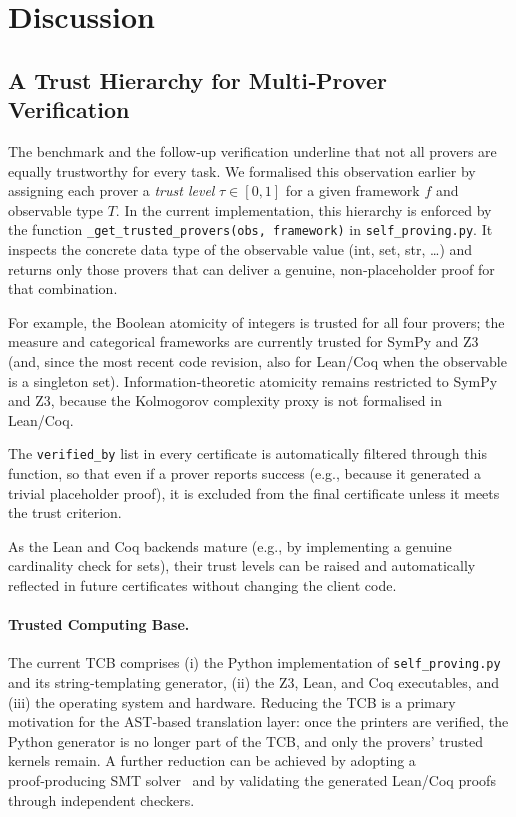 \newpage
\section{Discussion}

\subsection{A Trust Hierarchy for Multi‑Prover Verification}

The benchmark and the follow‑up verification underline that not all provers
are equally trustworthy for every task.  We formalised this observation
earlier by assigning each prover a \emph{trust level} $\tau \in [0,1]$
for a given framework $f$ and observable type $T$.  In the current
implementation, this hierarchy is enforced by the function
\texttt{\_get\_trusted\_provers(obs, framework)} in
\texttt{self\_proving.py}.  It inspects the concrete data type of the
observable value (int, set, str, …) and returns only those provers that
can deliver a genuine, non‑placeholder proof for that combination.

For example, the Boolean atomicity of integers is trusted for all four
provers; the measure and categorical frameworks are currently trusted for
SymPy and Z3 (and, since the most recent code revision, also for
Lean/Coq when the observable is a singleton set).  Information‑theoretic
atomicity remains restricted to SymPy and Z3, because the Kolmogorov
complexity proxy is not formalised in Lean/Coq.

The \texttt{verified\_by} list in every certificate is automatically
filtered through this function, so that even if a prover reports success
(e.g., because it generated a trivial placeholder proof), it is excluded
from the final certificate unless it meets the trust criterion.

As the Lean and Coq backends mature (e.g., by implementing a genuine
cardinality check for sets), their trust levels can be raised and
automatically reflected in future certificates without changing the
client code.

\paragraph{Trusted Computing Base.}
The current TCB comprises (i) the Python implementation of
\texttt{self\_proving.py} and its string‑templating generator,
(ii) the Z3, Lean, and Coq executables, and (iii) the operating system
and hardware.  Reducing the TCB is a primary motivation for the
AST‑based translation layer: once the printers are verified, the
Python generator is no longer part of the TCB, and only the provers'
trusted kernels remain.  A further reduction can be achieved by
adopting a proof‑producing SMT solver~\cite{deepspec2016} and by
validating the generated Lean/Coq proofs through independent checkers.

